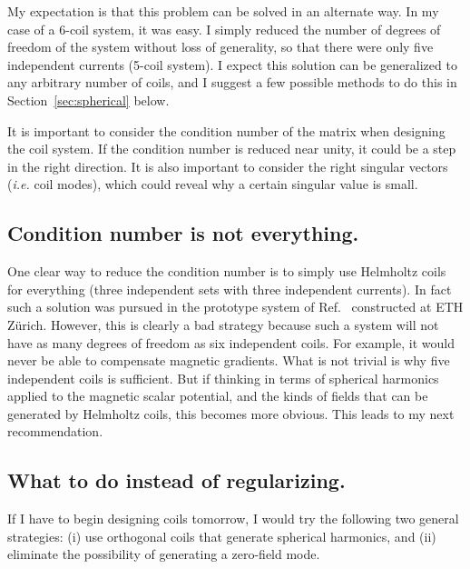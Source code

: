 My expectation is that this problem can be solved in an alternate way. In my case of a 6-coil system, it was easy. I simply reduced the number of degrees of freedom of the system without loss of generality, so that there were only five independent currents (5-coil system). I expect this solution can be generalized to any arbitrary number of coils, and I suggest a few possible methods to do this in Section~\ref{sec:spherical} below.

It is important to consider the condition number of the matrix when designing the coil system.  If the condition number is reduced near unity, it could be a step in the right direction.  It is also important to consider the right singular vectors ({\it i.e.} coil modes), which could reveal why a certain singular value is small.


\subsection{Condition number is not everything.}

One clear way to reduce the condition number is to simply use Helmholtz coils for everything (three independent sets with three independent currents).  In fact such a solution was pursued in the prototype system of Ref.~\cite{rawlik} constructed at ETH Z\"urich. However, this is clearly a bad strategy because such a system will not have as many degrees of freedom as six independent coils.  For example, it would never be able to compensate magnetic gradients. What is not trivial is why five independent coils is sufficient.  But if thinking in terms of spherical harmonics applied to the magnetic scalar potential, and the kinds of fields that can be generated by Helmholtz coils, this becomes more obvious.  This leads to my next recommendation.


\subsection{What to do instead of regularizing.\label{sec:spherical}}
If I have to begin designing coils tomorrow, I would try the following two general strategies: (i) use orthogonal coils that generate spherical harmonics, and (ii) eliminate the possibility of generating a zero-field mode.


